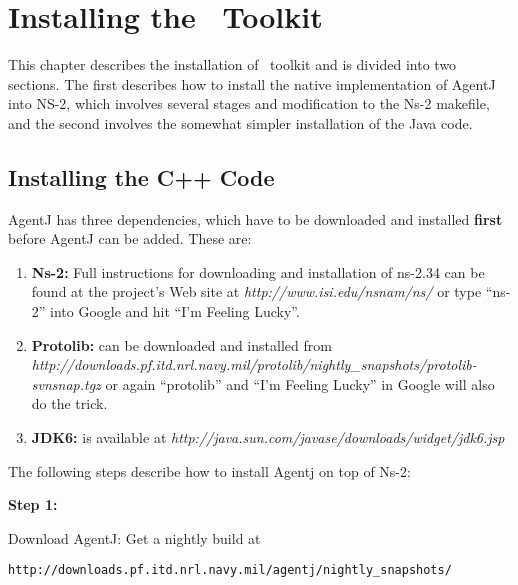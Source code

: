 \chapter{Installing the \agentj~Toolkit}
\label{install}

This chapter describes the installation of \agentj~toolkit and is divided into two sections.  The first describes how to install the native implementation of AgentJ into NS-2, which involves several stages and modification to the Ns-2 makefile, and the second involves the somewhat simpler installation of the Java code.

\section{Installing the C++ Code}
\label{install:agentj}


AgentJ has
three dependencies, which have to be downloaded and installed \textbf{first} before AgentJ
can be added. These are:

\begin{enumerate}
\item \textbf{Ns-2:} Full instructions for downloading and installation of ns-2.34 can be found at the project's Web site at \emph{http://www.isi.edu/nsnam/ns/} or type ``ns-2'' into Google and hit ``I'm Feeling Lucky''.
\item \sloppypar \textbf{Protolib:}  can be downloaded and installed from \newline \emph{http://downloads.pf.itd.nrl.navy.mil/protolib/nightly\_snapshots/protolib-svnsnap.tgz} or again ``protolib'' and ``I'm Feeling Lucky'' in Google will also do the trick.
\item \sloppypar \textbf{JDK6:} is available at \newline \emph{http://java.sun.com/javase/downloads/widget/jdk6.jsp}
\end{enumerate}


The following steps describe how to install Agentj on top of Ns-2:

\vspace{0.1in}

\noindent \textbf{Step 1:}

Download AgentJ: Get a nightly build at 

\footnotesize
\begin{verbatim}
http://downloads.pf.itd.nrl.navy.mil/agentj/nightly_snapshots/
\end{verbatim}
\normalsize

